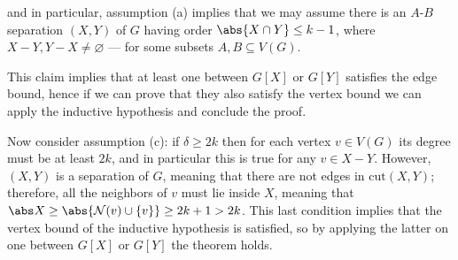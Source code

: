 \documentclass[a4paper, 12pt]{report}
\begin{document}
{        and in particular, assumption (a) implies that we may assume there is an $A$-$B$ separation $(X, Y)$ of $G$ having order $\abs{X \cap Y} \le k - 1$, where $X - Y , Y - X \neq \varnothing$ --- for some subsets $A, B \subseteq V(G)$.


        This claim implies that at least one between $G[X]$ or $G[Y]$ satisfies the edge bound, hence if we can prove that they also satisfy the vertex bound we can apply the inductive hypothesis and conclude the proof.

        Now consider assumption (c): if $\delta \ge 2k$ then for each vertex $v \in V(G)$ its degree must be at least $2k$, and in particular this is true for any $v \in X - Y$. However, $(X, Y)$ is a separation of $G$, meaning that there are not edges in $\mathrm{cut}(X, Y)$; therefore, all the neighbors of $v$ must lie inside $X$, meaning that $\abs X \ge \abs{\mathcal N(v) \cup \{v\}} \ge 2k + 1 > 2k$. This last condition implies that the vertex bound of the inductive hypothesis is satisfied, so by applying the latter on one between $G[X]$ or $G[Y]$ the theorem holds.
    }
\end{document}
